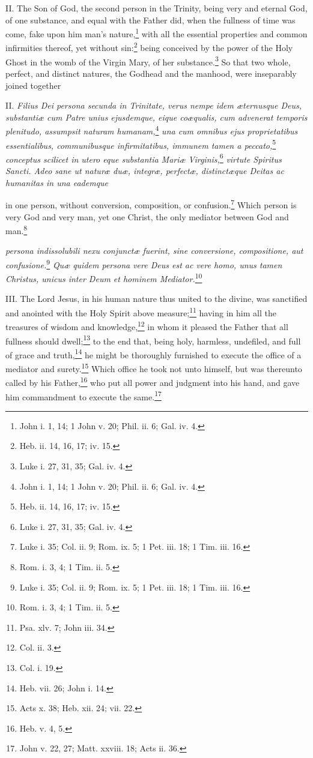 II. The Son of God, the second person in the Trinity, being very and eternal God, of one substance, and equal with the Father did, when the fullness of time was come, fake upon him man's nature,\footnote{John i. 1, 14; 1 John v. 20; Phil. ii. 6; Gal. iv. 4.} with all the essential properties and common infirmities thereof, yet without sin:\footnote{Heb. ii. 14, 16, 17; iv. 15.} being conceived by the power of the Holy Ghost in the womb of the Virgin Mary, of her substance.\footnote{Luke i. 27, 31, 35; Gal. iv. 4.} So that two whole, perfect, and distinct natures, the Godhead and the manhood, were inseparably joined together

II. \emph{Filius Dei persona secunda in Trinitate, verus nempe idem æternusque Deus, substantiæ cum Patre unius ejusdemque, eique coæqualis, cum advenerat temporis plenitudo, assumpsit naturam humanam,}\footnote{John i. 1, 14; 1 John v. 20; Phil. ii. 6; Gal. iv. 4.} \emph{una cum omnibus ejus proprietatibus essentialibus, communibusque infirmitatibus, immunem tamen a peccato,}\footnote{Heb. ii. 14, 16, 17; iv. 15.}\emph{ conceptus scilicet in utero eque substantia Mariæ Virginis,}\footnote{Luke i. 27, 31, 35; Gal. iv. 4.}\emph{ virtute Spiritus Sancti. Adeo sane ut naturæ duæ, integræ, perfectæ, distinctæque Deitas ac humanitas in una eademque }

in one person, without conversion, composition, or confusion.\footnote{Luke i. 35; Col. ii. 9; Rom. ix. 5; 1 Pet. iii. 18; 1 Tim. iii. 16.} Which person is very God and very man, yet one Christ, the only mediator between God and man.\footnote{Rom. i. 3, 4; 1 Tim. ii. 5.}

\emph{persona indissolubili nexu conjunctæ fuerint, sine conversione, compositione, aut confusione.}\footnote{Luke i. 35; Col. ii. 9; Rom. ix. 5; 1 Pet. iii. 18; 1 Tim. iii. 16.}\emph{ Quæ quidem persona vere Deus est ac vere homo, unus tamen Christus, unicus inter Deum et hominem Mediator.}\footnote{Rom. i. 3, 4; 1 Tim. ii. 5.}

III. The Lord Jesus, in his human nature thus united to the divine, was sanctified and anointed with the Holy Spirit above measure;\footnote{Psa. xlv. 7; John iii. 34.} having in him all the treasures of wisdom and knowledge,\footnote{Col. ii. 3.} in whom it pleased the Father that all fullness should dwell;\footnote{Col. i. 19.} to the end that, being holy, harmless, undefiled, and full of grace and truth,\footnote{Heb. vii. 26; John i. 14.} he might be thoroughly furnished to execute the office of a mediator and surety.\footnote{Acts x. 38; Heb. xii. 24; vii. 22.} Which office he took not unto himself, but was thereunto called by his Father,\footnote{Heb. v. 4, 5.} who put all power and judgment into his hand, and gave him commandment to execute the same.\footnote{John v. 22, 27; Matt. xxviii. 18; Acts ii. 36.}

